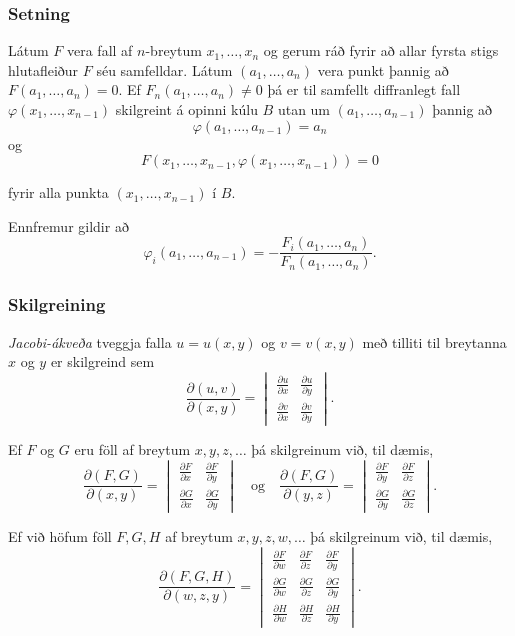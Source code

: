 \subsubsection{Setning }
Látum $F$ vera fall af $n$-breytum $x_1, \ldots,
x_n$ og gerum ráð fyrir að allar fyrsta stigs hlutafleiður  $F$ séu
samfelldar.   Látum $(a_1,\ldots,a_n)$ vera punkt þannig að 
$F(a_1,\ldots,a_n)=0$.  Ef $F_n(a_1,\ldots,a_n)\neq 0$ þá er til
samfellt diffranlegt fall $\varphi(x_1, \ldots, x_{n-1})$ skilgreint á 
opinni kúlu $B$
utan um $(a_1,\ldots,a_{n-1})$ þannig að 
$$\varphi(a_1,\ldots,a_{n-1})=a_n$$ 
og 
$$F(x_1,\ldots, x_{n-1}, \varphi(x_1, \ldots, x_{n-1}))=0$$

fyrir alla punkta $(x_1, \ldots, x_{n-1})$ í $B$.

Ennfremur gildir að 
$$\varphi_i(a_1,\ldots,a_{n-1})
=-\frac{F_i(a_1,\ldots,a_n)}{F_n(a_1,\ldots,a_n)}.$$ 



\subsubsection{Skilgreining }
  
{\em Jacobi-ákveða} tveggja falla $u=u(x,y)$ og $v=v(x,y)$ með
tilliti til breytanna $x$ og $y$ er skilgreind sem 
$$\frac{\partial(u,v)}{\partial(x,y)}=
\begin{vmatrix} 
\frac{\partial u}{\partial x}&\frac{\partial u}{\partial y}\\
\frac{\partial v}{\partial x}&\frac{\partial v}{\partial y}
\end{vmatrix}.$$



Ef $F$ og $G$ eru föll af breytum $x,y,z,\ldots$ þá skilgreinum við,
til dæmis,
$$\frac{\partial(F,G)}{\partial(x,y)}=
\begin{vmatrix} 
\frac{\partial F}{\partial x}&\frac{\partial F}{\partial y}\\
\frac{\partial G}{\partial x}&\frac{\partial G}{\partial y}
\end{vmatrix}\quad \mbox{og}\quad
\frac{\partial(F,G)}{\partial(y,z)}=
\begin{vmatrix} 
\frac{\partial F}{\partial y}&\frac{\partial F}{\partial z}\\
\frac{\partial G}{\partial y}&\frac{\partial G}{\partial z}
\end{vmatrix}.$$

Ef við höfum föll $F, G, H$ af breytum $x,y,z,w,\ldots$ þá
skilgreinum við, til dæmis,
$$\frac{\partial(F,G,H)}{\partial(w,z,y)}=
\begin{vmatrix} 
\frac{\partial F}{\partial w}&\frac{\partial F}{\partial z}
&\frac{\partial F}{\partial y}\\
\frac{\partial G}{\partial w}&\frac{\partial G}{\partial z}
&\frac{\partial G}{\partial y}\\
\frac{\partial H}{\partial w}&\frac{\partial H}{\partial z}
&\frac{\partial H}{\partial y}
\end{vmatrix}.$$




